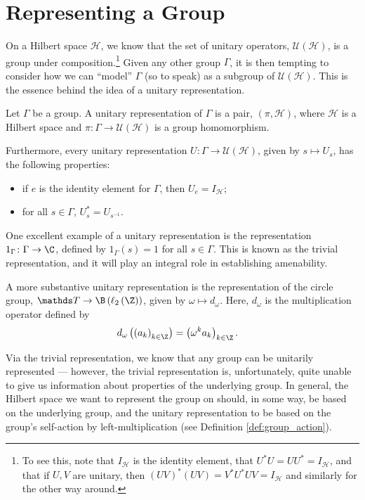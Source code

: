 \section{Representing a Group}%
On a Hilbert space $\mathcal{H}$, we know that the set of unitary operators, $\mathcal{U}\left(\mathcal{H}\right)$, is a group under composition.\footnote{To see this, note that $I_{\mathcal{H}}$ is the identity element, that $U^{\ast}U =UU^{\ast} = I_{\mathcal{H}}$, and that if $U,V$ are unitary, then $\left( UV \right)^{\ast}\left( UV \right) = V^{\ast}U^{\ast}UV = I_{\mathcal{H}}$ and similarly for the other way around.} Given any other group $\Gamma$, it is then tempting to consider how we can ``model'' $\Gamma$ (so to speak) as a subgroup of $\mathcal{U}\left(\mathcal{H}\right)$. This is the essence behind the idea of a unitary representation.
\begin{definition}
  Let $\Gamma$ be a group. A unitary representation of $\Gamma$ is a pair, $\left(\pi,\mathcal{H}\right)$, where $\mathcal{H}$ is a Hilbert space and $\pi\colon \Gamma\rightarrow \mathcal{U}\left(\mathcal{H}\right)$ is a group homomorphism.\newline

  Furthermore, every unitary representation $U\colon \Gamma\rightarrow \mathcal{U}\left(\mathcal{H}\right)$, given by $s\mapsto U_s$, has the following properties:
  \begin{itemize}
    \item if $e$ is the identity element for $\Gamma$, then $U_{e} = I_{\mathcal{H}}$;
    \item for all $s\in \Gamma$, $U_{s}^{\ast} = U_{s^{-1}}$.
  \end{itemize}
\end{definition}
\begin{example}\label{ex:some_representations}
  One excellent example of a unitary representation is the representation $1_{\Gamma}\colon \Gamma\rightarrow \C$, defined by $1_{\Gamma}(s) = 1$ for all $s\in\Gamma$. This is known as the trivial representation, and it will play an integral role in establishing amenability.\newline

  A more substantive unitary representation is the representation of the circle group, $\mathbb{T}\rightarrow \B\left(\ell_2\left(\Z\right)\right)$, given by $\omega \mapsto d_{\omega}$. Here, $d_{\omega}$ is the multiplication operator defined by
  \begin{align*}
    d_{\omega}\left(\left(a_{k}\right)_{k\in\Z}\right) &= \left(\omega^k a_{k}\right)_{k\in\Z}.
  \end{align*}
\end{example}
Via the trivial representation, we know that any group can be unitarily represented --- however, the trivial representation is, unfortunately, quite unable to give us information about properties of the underlying group. In general, the Hilbert space we want to represent the group on should, in some way, be based on the underlying group, and the unitary representation to be based on the group's self-action by left-multiplication (see Definition \ref{def:group_action}).\newline

